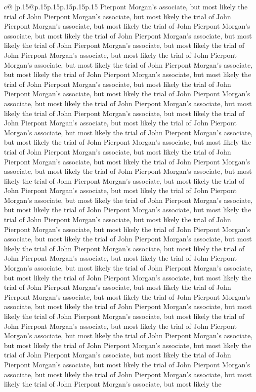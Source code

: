 \documentclass{article}
\begin{document}
{\begin{supertabular}{c@{$\;$}|p{.15\linewidth}@{}p{.15\linewidth}p{.15\linewidth}p{.15\linewidth}p{.15\linewidth}p{.15\linewidth}}
{{{Pierpont Morgan's associate, but most likely the trial of John Pierpont Morgan's associate, but most likely the trial of John Pierpont Morgan's associate, but most likely the trial of John Pierpont Morgan's associate, but most likely the trial of John Pierpont Morgan's associate, but most likely the trial of John Pierpont Morgan's associate, but most likely the trial of John Pierpont Morgan's associate, but most likely the trial of John Pierpont Morgan's associate, but most likely the trial of John Pierpont Morgan's associate, but most likely the trial of John Pierpont Morgan's associate, but most likely the trial of John Pierpont Morgan's associate, but most likely the trial of John Pierpont Morgan's associate, but most likely the trial of John Pierpont Morgan's associate, but most likely the trial of John Pierpont Morgan's associate, but most likely the trial of John Pierpont Morgan's associate, but most likely the trial of John Pierpont Morgan's associate, but most likely the trial of John Pierpont Morgan's associate, but most likely the trial of John Pierpont Morgan's associate, but most likely the trial of John Pierpont Morgan's associate, but most likely the trial of John Pierpont Morgan's associate, but most likely the trial of John Pierpont Morgan's associate, but most likely the trial of John Pierpont Morgan's associate, but most likely the trial of John Pierpont Morgan's associate, but most likely the trial of John Pierpont Morgan's associate, but most likely the trial of John Pierpont Morgan's associate, but most likely the trial of John Pierpont Morgan's associate, but most likely the trial of John Pierpont Morgan's associate, but most likely the trial of John Pierpont Morgan's associate, but most likely the trial of John Pierpont Morgan's associate, but most likely the trial of John Pierpont Morgan's associate, but most likely the trial of John Pierpont Morgan's associate, but most likely the trial of John Pierpont Morgan's associate, but most likely the trial of John Pierpont Morgan's associate, but most likely the trial of John Pierpont Morgan's associate, but most likely the trial of John Pierpont Morgan's associate, but most likely the trial of John Pierpont Morgan's associate, but most likely the trial of John Pierpont Morgan's associate, but most likely the trial of John Pierpont Morgan's associate, but most likely the trial of John Pierpont Morgan's associate, but most likely the trial of John Pierpont Morgan's associate, but most likely the trial of John Pierpont Morgan's associate, but most likely the trial of John Pierpont Morgan's associate, but most likely the trial of John Pierpont Morgan's associate, but most likely the trial of John Pierpont Morgan's associate, but most likely the trial of John Pierpont Morgan's associate, but most likely the trial of John Pierpont Morgan's associate, but most likely the trial of John Pierpont Morgan's associate, but most likely the trial of John Pierpont Morgan's associate, but most likely the trial of John Pierpont Morgan's associate, but most likely the trial of John Pierpont Morgan's associate, but most likely the trial of John Pierpont Morgan's associate, but most likely the }}}
\end{supertabular}}
\end{document}
